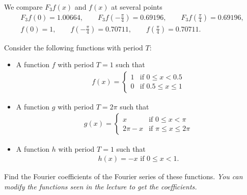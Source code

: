 \documentclass[11pt]{article}
\begin{document}
\begin{solution}
We compare $F_3f(x)$ and $f(x)$ at several points 
\begin{gather*}
    F_3f(0) = 1.00664,\qquad 
    F_3f\left(-\frac{\pi}{4}\right) = 0.69196,\qquad 
    F_3f\left(\frac{\pi}{4}\right) = 0.69196,
    \\
    f(0) = 1,\qquad 
    f\left(-\frac{\pi}{4}\right) = 0.70711,\qquad
    f\left(\frac{\pi}{4}\right) = 0.70711.
\end{gather*}

\end{solution}





\begin{exercise}
    Consider the following functions with period $T$:
    \begin{itemize}
        \item A function $f$ with period $T = 1$ such that 
        \begin{align*}
            f(x) = 
            \left\{\begin{array}{ll}
                1 & \text{if } 0 \leq x < 0.5 \\
                0 & \text{if } 0.5 \leq x \leq 1
            \end{array}\right.
        \end{align*}
        \item A function $g$ with period $T = 2\pi$ such that 
        \begin{align*}
            g(x) = 
            \left\{\begin{array}{ll}
                x & \text{if } 0 \leq x < \pi \\
                2\pi - x & \text{if } \pi \leq x \leq 2\pi
            \end{array}\right.
        \end{align*}
        \item A function $h$ with period $T = 1$ such that 
        \begin{align*}
            h(x) = -x \text{ if } 0 \leq x < 1.
        \end{align*}
    \end{itemize}
    Find the Fourier coefficients of the Fourier series of these functions. 
    \textit{You can modify the functions seen in the lecture to get the coefficients.}
\end{exercise}
\end{document}
